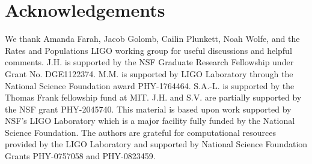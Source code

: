 \documentclass[%
reprint,
 amsmath,amssymb,
 aps,
 prd,nofootinbib,nobibnotes,
 superscriptaddress,groupedaddress,
]{revtex4-2}
\begin{document}
\section*{Acknowledgements}

We thank Amanda Farah, Jacob Golomb, Cailin Plunkett, Noah Wolfe, and the Rates and Populations LIGO working group for useful discussions and helpful comments.
%
J.H. is supported by the NSF Graduate Research Fellowship under Grant No. DGE1122374.
%
M.M. is supported by LIGO Laboratory through the National Science Foundation award PHY-1764464.
%
S.A.-L. is supported by the Thomas Frank fellowship fund at MIT.
%
J.H. and S.V. are partially supported by the NSF grant PHY-2045740.
%
This material is based upon work supported by NSF's LIGO Laboratory which is a major facility fully funded by the National Science Foundation.
%
The authors are grateful for computational resources provided by the LIGO Laboratory and supported by National Science Foundation Grants PHY-0757058 and PHY-0823459.


\end{document}
